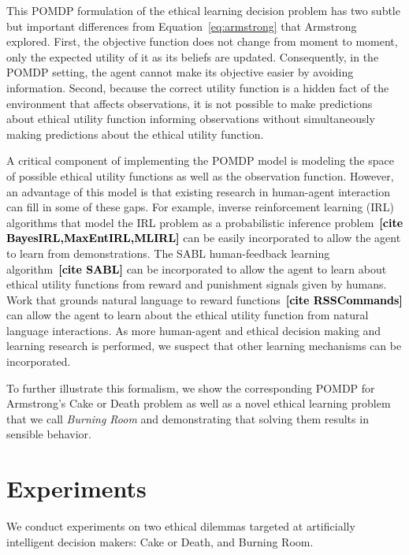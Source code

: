 \documentclass[11pt]{article}
\newcommand\ncitea[1]{\textcolor{black}{{\bf [cite #1]}}}
\begin{document}
This POMDP formulation of the ethical learning decision problem has two subtle but important differences from Equation~\ref{eq:armstrong} that Armstrong explored. First, the objective function does not change from moment to moment, only the expected utility of it as its beliefs are updated. Consequently, in the POMDP setting, the agent cannot make its objective easier by avoiding information. Second, because the correct utility function is a hidden fact of the environment that affects observations, it is not possible to make predictions about ethical utility function informing observations without simultaneously making predictions about the ethical utility function.

A critical component of implementing the POMDP model is modeling the space of possible ethical utility functions as well as the observation function. However, an advantage of this model is that existing research in human-agent interaction can fill in some of these gaps. For example, inverse reinforcement learning (IRL) algorithms that model the IRL problem as a probabilistic inference problem~\ncitea{BayesIRL,MaxEntIRL,MLIRL} can be easily incorporated to allow the agent to learn from demonstrations. The SABL human-feedback learning algorithm~\ncitea{SABL} can be incorporated to allow the agent to learn about ethical utility functions from reward and punishment signals given by humans. Work that grounds natural language to reward functions~\ncitea{RSSCommands} can allow the agent to learn about the ethical utility function from natural language interactions. As more human-agent and ethical decision making and learning research is performed, we suspect that other learning mechanisms can be incorporated.

To further illustrate this formalism, we show the corresponding POMDP for Armstrong's Cake or Death problem as well as a novel ethical learning problem that we call {\em Burning Room} and demonstrating that solving them results in sensible behavior.






\section{Experiments}

We conduct experiments on two ethical dilemmas targeted at artificially intelligent decision makers: Cake or Death, and Burning Room.
\end{document}
